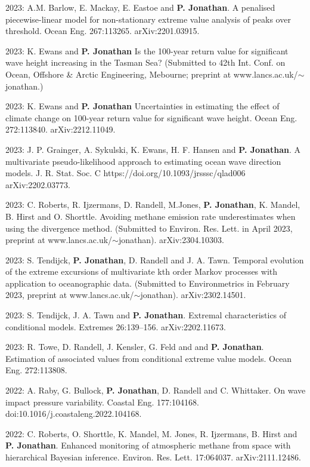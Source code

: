 \documentclass[11pt,a4paper]{moderncv}
\begin{document}
2023:  A.M. Barlow, E. Mackay, E. Eastoe and \textbf{P. Jonathan}. A penalised piecewise-linear model for non-stationary extreme value analysis of peaks over threshold. Ocean Eng. 267:113265. arXiv:2201.03915.

2023: K. Ewans and \textbf{P. Jonathan} Is the 100-year return value for significant wave height increasing in the Tasman Sea? (Submitted to 42th Int. Conf. on Ocean, Offshore \& Arctic Engineering, Mebourne; preprint at  www.lancs.ac.uk/$\sim$jonathan.)

2023: K. Ewans and \textbf{P. Jonathan} Uncertainties in estimating the effect of climate change on 100-year return value for significant wave height. Ocean Eng. 272:113840. arXiv:2212.11049.

2023: J. P. Grainger, A. Sykulski, K. Ewans, H. F. Hansen and \textbf{P. Jonathan}. A multivariate pseudo-likelihood approach to estimating ocean wave direction models. J. R. Stat. Soc. C https://doi.org/10.1093/jrsssc/qlad006 arXiv:2202.03773.

2023: C. Roberts, R. Ijzermans, D. Randell, M.Jones, \textbf{P. Jonathan}, K. Mandel, B. Hirst and O. Shorttle. Avoiding methane emission rate underestimates when using the divergence method. (Submitted to Environ. Res. Lett. in April 2023, preprint at www.lancs.ac.uk/$\sim$jonathan). arXiv:2304.10303.

2023: S. Tendijck, \textbf{P. Jonathan}, D. Randell and J. A. Tawn. Temporal evolution of the extreme excursions of multivariate kth order Markov processes with application to oceanographic data. (Submitted to Environmetrics in February 2023, preprint at www.lancs.ac.uk/$\sim$jonathan). arXiv:2302.14501.

2023: S. Tendijck, J. A. Tawn and \textbf{P. Jonathan}. Extremal characteristics of conditional models. Extremes 26:139–156. arXiv:2202.11673.

2023: R. Towe, D. Randell, J. Kensler, G. Feld and and \textbf{P. Jonathan}. Estimation of associated values from conditional extreme value models. Ocean Eng. 272:113808.

2022: A. Raby, G. Bullock, \textbf{P. Jonathan}, D. Randell and C. Whittaker. On wave impact pressure variability. Coastal Eng. 177:104168. doi:10.1016/j.coastaleng.2022.104168.

2022: C. Roberts, O. Shorttle, K. Mandel, M. Jones, R. Ijzermans, B. Hirst and \textbf{P. Jonathan}. Enhanced monitoring of atmospheric methane from space with hierarchical Bayesian inference. Environ. Res. Lett. 17:064037. arXiv:2111.12486.
\end{document}
